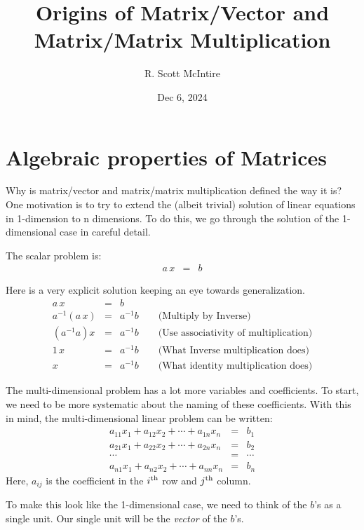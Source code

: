 \documentclass{article}
\title{Origins of Matrix/Vector and Matrix/Matrix Multiplication}
\author{R. Scott McIntire}
\date{Dec 6, 2024}
\begin{document}
\maketitle


\section{Algebraic properties of Matrices}
Why is matrix/vector and matrix/matrix multiplication defined the way it is?
One motivation is to try to extend the (albeit trivial) solution of linear
equations in 1-dimension to n dimensions. To do this, we go through the solution
of the 1-dimensional case in careful detail.

The scalar problem is:
\begin{eqnarray}
  a \, x & = & b \label{scalar-problem}
\end{eqnarray}

Here is a very explicit solution keeping an eye towards generalization.
\begin{eqnarray}
  a \, x & = & b \\
  a^{-1} ( a \, x ) & = & a^{-1} b \quad \quad \text{(Multiply by Inverse)} \label{inv} \\
  (a^{-1} a) x & = & a^{-1} b \quad \quad \text{(Use associativity of multiplication)} \label{assoc} \\
  1 \, x & = & a^{-1} b \quad \quad \text{(What Inverse multiplication does)} \label{inv-mult} \\
  x & = & a^{-1} b \quad \quad \text{(What identity multiplication does)} \label{identity}
\end{eqnarray}

The multi-dimensional problem has a lot more variables and coefficients.
To start, we need to be more systematic about the naming of these coefficients.
With this in mind, the multi-dimensional linear problem can be written:
\begin{eqnarray*}
  a_{11} x_1 + a_{12} x_2 + \cdots + a_{1n} x_n & = & b_1 \\
  a_{21} x_1 + a_{22} x_2 + \cdots + a_{2n} x_n & = & b_2 \\
  \cdots & = & \cdots \\
  a_{n1} x_1 + a_{n2} x_2 + \cdots + a_{nn} x_n & = & b_n 
\end{eqnarray*}
Here, $a_{ij}$ is the coefficient in the $i^{\rm th}$ row and $j^{\rm th}$ column.


To make this look like the 1-dimensional case, we need to think of the $b$'s as
a single unit. Our single unit will be the {\em vector\/} of the $b$'s.
\end{document}
